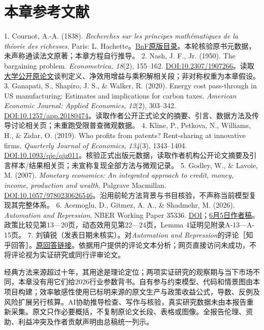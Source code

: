 \documentclass[UTF8,fontset=windows,12pt,a4paper,oneside,openany]{ctexbook}
\begin{document}
\section*{本章参考文献}

1. Cournot, A.-A. (1838). \emph{Recherches sur les principes mathématiques de la théorie des richesses}. Paris: L. Hachette。\href{https://catalogue.bnf.fr/ark:/12148/cb30280488q}{BnF原版目录}。本轮核验原书元数据，未声称通读法文原著；本章方程自行推导。
2. Nash, J. F., Jr. (1950). The bargaining problem. \emph{Econometrica, 18}(2), 155–162. \href{https://doi.org/10.2307/1907266}{DOI:10.2307/1907266}。读取\href{https://www.haverford.edu/sites/default/files/Nash1950.pdf}{大学公开原论文}谈判定义、净效用增益与乘积解相关段；非对称权重为本章假设。
3. Ganapati, S., Shapiro, J. S., \& Walker, R. (2020). Energy cost pass-through in US manufacturing: Estimates and implications for carbon taxes. \emph{American Economic Journal: Applied Economics, 12}(2), 303–342. \href{https://doi.org/10.1257/app.20180474}{DOI:10.1257/app.20180474}。读取作者公开正式论文的摘要、引言、数据方法及传导讨论相关页；未重跑受限普查微观数据。
4. Kline, P., Petkova, N., Williams, H., \& Zidar, O. (2019). Who profits from patents? Rent-sharing at innovative firms. \emph{Quarterly Journal of Economics, 134}(3), 1343–1404. \href{https://doi.org/10.1093/qje/qjz011}{DOI:10.1093/qje/qjz011}。核验正式出版元数据，读取作者机构公开论文摘要及引言样本/结果相关页；未宣称复现全部方法与微观记录。
5. Godley, W., \& Lavoie, M. (2007). \emph{Monetary economics: An integrated approach to credit, money, income, production and wealth}. Palgrave Macmillan. \href{https://doi.org/10.1057/9780230626546}{DOI:10.1057/9780230626546}。沿用前轮方法背景与书目核验，不声称当前模型复现其完整体系。
6. Acemoglu, D., Gitmez, A. A., \& Shadmehr, M. (2026). \emph{Automation and Repression}. NBER Working Paper 35336. \href{https://doi.org/10.3386/w35336}{DOI}；\href{https://economics.mit.edu/sites/default/files/2026-06/Automation\%20and\%20Repression.pdf}{6月5日作者稿}。政策比较见第13—20页，动态效用见第22—24页，Lemma 4证明见附录A-13—A-15页。
7. 刘镇锐（发表日期未核实）。对\emph{Automation and Repression}的评论［知乎回答］。\href{https://www.zhihu.com/question/2083147887706366153/answer/2088453310651032052}{原回答链接}。依据用户提供的评论文本分析；网页直接访问未成功，不将评论视为实证研究或同行评审论文。

经典方法来源超过十年，其用途是理论定位；两项实证研究的观察期与当下市场不同，本章没有用它们给2026行业参数背书。自有参与约束模型、代码和情景图由本项目构建；效率敏感性使用已标明来源的原文生产与政策收益公式，导数、反例及风险扩展另行核算。AI协助推导检查、写作与核验，真实研究数据未由本报告重新采集。原文只作必要概括，不复制原论文长段、表格或图像。全报告伦理、资助、利益冲突及作者贡献声明由总稿统一列示。
\end{document}
